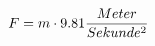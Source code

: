 \documentclass[preview]{standalone}
\begin{document}
\begin{align*}
\special{dvisvgm:raw <g id='unique000'>}F = m \cdot 9.81 \frac{Meter}{Sekunde^{2}}\special{dvisvgm:raw </g>}
\end{align*}
\end{document}
